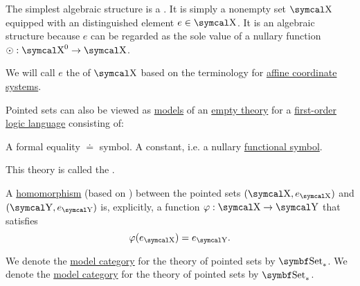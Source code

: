 \begin{definition}\label{def:pointed_set}
  The simplest algebraic structure is a . It is simply a nonempty set \( \CX \) equipped with an distinguished element \( e \in \CX \). It is an algebraic structure because \( e \) can be regarded as the sole value of a nullary function \( \odot: \CX^0 \to \CX \).

  We will call \( e \) the  of \( \CX \) based on the terminology for \hyperref[def:euclidean_plane_coordinate_system/origin]{affine coordinate systems}.

  \begin{DefEnum}
     Pointed sets can also be viewed as \hyperref[def:first_order_model]{models} of an \hyperref[def:first_order_theory]{empty theory} for a \hyperref[def:first_order_logic_language]{first-order logic language} consisting of:
    \begin{DefEnum}
       A formal equality \( \doteq \) symbol.
       A constant, i.e. a nullary \hyperref[def:first_order_logic_language/func]{functional symbol}.
    \end{DefEnum}

    This theory is called the .

     A \hyperref[def:first_order_homomorphism]{homomorphism} (based on ) between the pointed sets \( (\CX, e_{\CX}) \) and \( (\CY, e_{\CY}) \) is, explicitly, a function \( \varphi: \CX \to \CY \) that satisfies
    \begin{equation}\label{eq:def:pointed_set/homomorphism}
      \varphi(e_{\CX}) = e_{\CY}.
    \end{equation}

     We denote the \hyperref[def:first_order_model_category]{model category} for the theory of pointed sets by \( \Cat{Set}_* \). We denote the \hyperref[def:first_order_model_category]{model category} for the theory of pointed sets by \( \Cat{Set}_* \).
  \end{DefEnum}
\end{definition}
